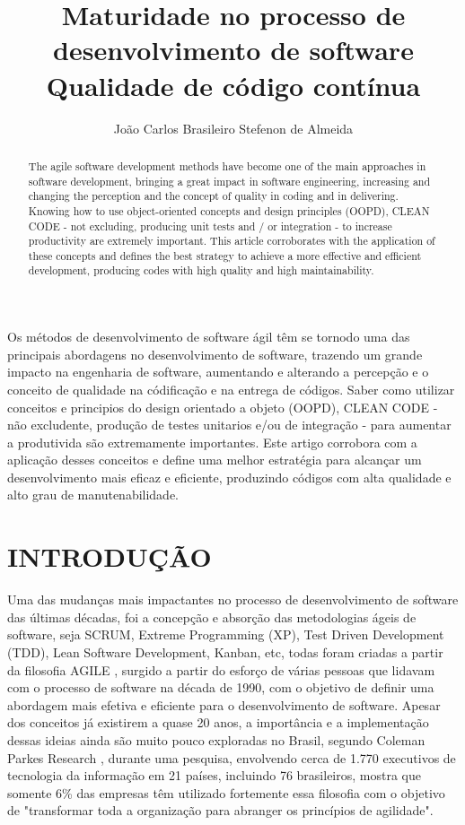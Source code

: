 \documentclass[12pt]{article}
\title{Maturidade no processo de desenvolvimento de software\\ Qualidade de código contínua }
\author{João Carlos Brasileiro Stefenon de Almeida\inst{1}}
\begin{document}
 


\maketitle

  
\begin{resumo} 
Os métodos de desenvolvimento de software ágil têm se tornodo uma das principais abordagens no desenvolvimento de software, trazendo um grande impacto na engenharia de software, aumentando e alterando a percepção e o conceito de qualidade na códificação e na entrega de códigos.
Saber como utilizar conceitos e principios do design orientado a objeto (OOPD), CLEAN CODE - não excludente, produção de testes unitarios e/ou de integração - para aumentar a produtivida são extremamente importantes.
Este artigo corrobora com a aplicação desses conceitos e define uma melhor estratégia para alcançar um desenvolvimento mais eficaz e eficiente, produzindo códigos com alta qualidade e alto grau de manutenabilidade.
\end{resumo}

\begin{abstract}
The agile software development methods have become one of the main approaches in software development, bringing a great impact in software engineering, increasing and changing the perception and the concept of quality in coding and in delivering.
Knowing how to use object-oriented concepts and design principles (OOPD), CLEAN CODE - not excluding, producing unit tests and / or integration - to increase productivity are extremely important.
This article corroborates with the application of these concepts and defines the best strategy to achieve a more effective and efficient development, producing codes with high quality and high maintainability.
\end{abstract}



\part{INTRODUÇÃO}

 Uma das mudanças mais impactantes no processo de desenvolvimento de software das últimas décadas, foi a concepção e absorção das metodologias ágeis de software, seja SCRUM, Extreme Programming (XP), Test Driven Development (TDD), Lean Software Development, Kanban, etc, todas foram criadas a partir da filosofia AGILE \cite{MANISFESTOAGILE}, surgido a partir do esforço de várias pessoas que lidavam com o processo de software na década de 1990, com o objetivo de definir uma abordagem mais efetiva e eficiente para o desenvolvimento de software. Apesar dos conceitos já existirem a quase 20 anos, a importância e a implementação dessas ideias ainda são muito pouco exploradas no Brasil, segundo Coleman Parkes Research \cite{COLEMANPARKES_AGILE_2017}, durante uma pesquisa, envolvendo cerca de 1.770 executivos de tecnologia da informação em 21 países, incluindo 76 brasileiros, mostra que somente 6\% das empresas têm utilizado fortemente essa filosofia com o objetivo de "transformar toda a organização para abranger os princípios de agilidade".
\end{document}
